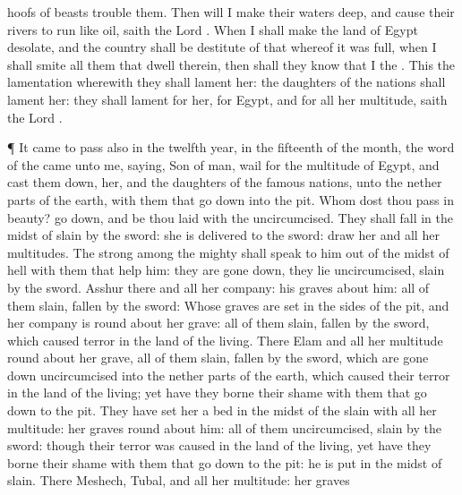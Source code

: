 {hoofs of
beasts
trouble them.
Then will I make their
waters
deep, and cause their
rivers to
run like
oil,
saith the
Lord
{}.
When I shall
make the
land of
Egypt
desolate, and the
country shall be
destitute of that whereof it was
full, when I shall
smite all them that
dwell therein, then shall they
know that I
{} the
{}.
This
{} the
lamentation wherewith they shall
lament her: the
daughters of the
nations shall
lament her: they shall
lament for her,
{} for
Egypt, and for all her
multitude,
saith the
Lord
{}.
\par }{\PP {}¶ It came to pass also in the
twelfth
year, in the
fifteenth
{} of the
month,
{} the
word of the
{} came unto me,
saying,
Son of
man,
wail for the
multitude of
Egypt, and cast them
down,
{} her, and the
daughters of the
famous
nations, unto the nether
parts of the
earth, with them that go
down into the
pit.
Whom dost thou pass in
beauty? go
down, and be thou
laid with the
uncircumcised.
They shall
fall in the
midst of
{}
slain by the
sword: she is
delivered to the
sword:
draw her and all her
multitudes.
The
strong among the
mighty shall
speak to him out of the
midst of
hell with them that
help him: they are gone
down, they
lie
uncircumcised,
slain by the
sword.
Asshur
{} there and all her
company: his
graves
{}
about him: all of them
slain,
fallen by the
sword:
Whose
graves are
set in the
sides of the
pit, and her
company is round
about her
grave: all of them
slain,
fallen by the
sword, which
caused
terror in the
land of the
living.
There
{}
Elam and all her
multitude round
about her
grave, all of them
slain,
fallen by the
sword, which are gone
down
uncircumcised into the nether
parts of the
earth, which
caused their
terror in the
land of the
living; yet have they
borne their
shame with them that go
down to the
pit.
They have
set her a
bed in the
midst of the
slain with all her
multitude: her
graves
{} round
about him: all of them
uncircumcised,
slain by the
sword: though their
terror was
caused in the
land of the
living, yet have they
borne their
shame with them that go
down to the
pit: he is
put in the
midst of
{}
slain.
There
{}
Meshech,
Tubal, and all her
multitude: her
graves
}
